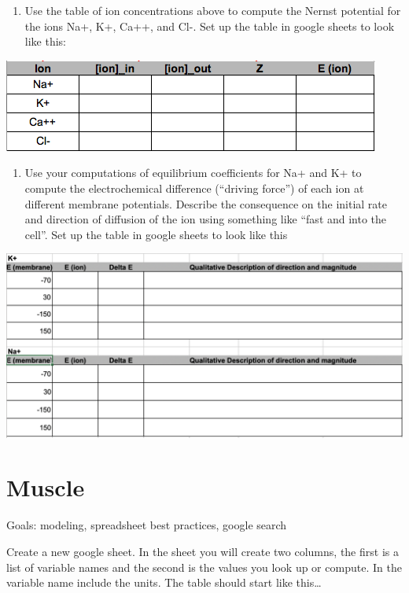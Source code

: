 \documentclass[]{book}
\providecommand{\tightlist}{%
  \setlength{\itemsep}{0pt}\setlength{\parskip}{0pt}}
\begin{document}
\begin{enumerate}
\def\labelenumi{\arabic{enumi}.}
\tightlist
\item
  Use the table of ion concentrations above to compute the Nernst
  potential for the ions Na+, K+, Ca++, and Cl-. Set up the table in
  google sheets to look like this:
\end{enumerate}

\includegraphics{images/nernst-output_table_1.png}

\begin{enumerate}
\def\labelenumi{\arabic{enumi}.}
\setcounter{enumi}{1}
\tightlist
\item
  Use your computations of equilibrium coefficients for Na+ and K+ to
  compute the electrochemical difference (``driving force'') of each ion
  at different membrane potentials. Describe the consequence on the
  initial rate and direction of diffusion of the ion using something
  like ``fast and into the cell''. Set up the table in google sheets to
  look like this
\end{enumerate}

\includegraphics{images/nernst-output_table_2.png}

\chapter{Muscle}\label{muscle}

Goals: modeling, spreadsheet best practices, google search

Create a new google sheet. In the sheet you will create two columns, the
first is a list of variable names and the second is the values you look
up or compute. In the variable name include the units. The table should
start like this\ldots{}
\end{document}
